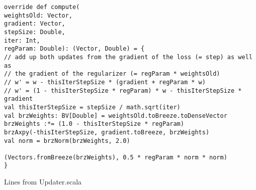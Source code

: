 \begin{listing}[H]
\begin{verbatim}
override def compute(
weightsOld: Vector,
gradient: Vector,
stepSize: Double,
iter: Int,
regParam: Double): (Vector, Double) = {
// add up both updates from the gradient of the loss (= step) as well as
// the gradient of the regularizer (= regParam * weightsOld)
// w' = w - thisIterStepSize * (gradient + regParam * w)
// w' = (1 - thisIterStepSize * regParam) * w - thisIterStepSize * gradient
val thisIterStepSize = stepSize / math.sqrt(iter)
val brzWeights: BV[Double] = weightsOld.toBreeze.toDenseVector
brzWeights :*= (1.0 - thisIterStepSize * regParam)
brzAxpy(-thisIterStepSize, gradient.toBreeze, brzWeights)
val norm = brzNorm(brzWeights, 2.0)

(Vectors.fromBreeze(brzWeights), 0.5 * regParam * norm * norm)
}
\end{verbatim}
\caption{Lines from Updater.scala}
\label{lst:updatercal}
\end{listing}

